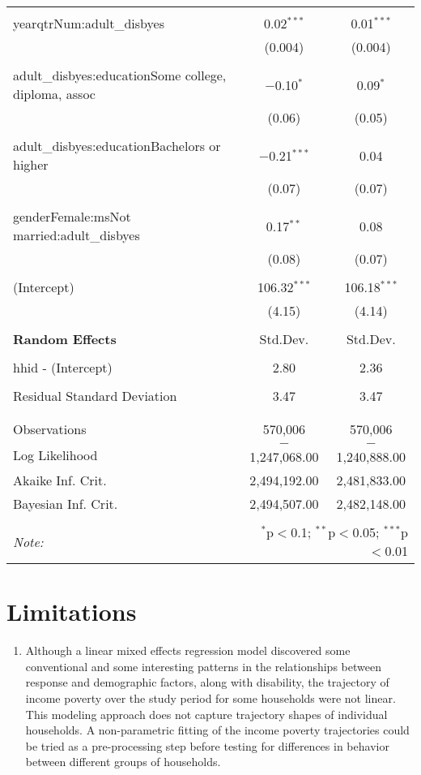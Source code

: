 \documentclass[11pt]{extarticle} %
\begin{document}
\begin{table}[!htbp]
\begin{tabular}{@{\extracolsep{5pt}}lcc}
  & & \\ 
 yearqtrNum:adult\_disbyes & 0.02$^{***}$ & 0.01$^{***}$ \\ 
  & (0.004) & (0.004) \\ 
  & & \\ 
 adult\_disbyes:educationSome college, diploma, assoc & $-$0.10$^{*}$ & 0.09$^{*}$ \\ 
  & (0.06) & (0.05) \\ 
  & & \\ 
 adult\_disbyes:educationBachelors or higher & $-$0.21$^{***}$ & 0.04 \\ 
  & (0.07) & (0.07) \\ 
  & & \\ 
 genderFemale:msNot married:adult\_disbyes & 0.17$^{**}$ & 0.08 \\ 
  & (0.08) & (0.07) \\ 
  & & \\ 
 (Intercept) & 106.32$^{***}$ & 106.18$^{***}$ \\ 
  & (4.15) & (4.14) \\ 
\hline\\[-1.8ex]
{\bf Random Effects} & Std.Dev. & Std.Dev.\\
\hline\\[-1.8ex]
hhid - (Intercept) & 2.80 & 2.36\\
\\
Residual Standard Deviation & 3.47 & 3.47\\
  & & \\ 
\hline \\[-1.8ex] 
Observations & 570,006 & 570,006 \\ 
Log Likelihood & $-$1,247,068.00 & $-$1,240,888.00 \\ 
Akaike Inf. Crit. & 2,494,192.00 & 2,481,833.00 \\ 
Bayesian Inf. Crit. & 2,494,507.00 & 2,482,148.00 \\ 
\hline 
\hline \\[-1.8ex] 
\textit{Note:}  & \multicolumn{2}{r}{$^{*}$p$<$0.1; $^{**}$p$<$0.05; $^{***}$p$<$0.01} \\ 
\end{tabular} 
\end{table} 


\section{Limitations}
\begin{enumerate}
\item Although a linear mixed effects regression model discovered some conventional and some interesting patterns in the relationships between response and demographic factors, along with disability, the trajectory of income poverty over the study period for some households were not linear. This modeling approach does not capture trajectory shapes of individual households. A non-parametric fitting of the income poverty trajectories could be tried as a pre-processing step before testing for differences in behavior between different groups of households. 
\end{enumerate}

\newpage

\end{document}
